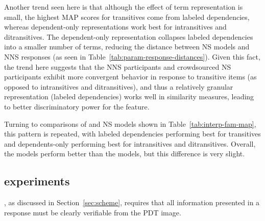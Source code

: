 Another trend seen here is that although the effect of term representation is small, the highest MAP scores for transitives come from labeled dependencies, whereas dependent-only representations work best for intransitives and ditransitives. The dependent-only representation collapses labeled dependencies into a smaller number of terms, reducing the distance between NS models and NNS responses (as seen in Table~\ref{tab:param-response-distances}). Given this fact, the trend here suggests that the NNS participants and crowdsourced NS participants exhibit more convergent behavior in response to transitive items (as opposed to intransitives and ditransitives), and thus a relatively granular representation (labeled dependencies) works well in similarity measures, leading to better discriminatory power for the  feature.

Turning to comparisons of  and  NS models shown in Table~\ref{tab:interp-fam-map}, this pattern is repeated, with labeled dependencies performing best for transitives and dependents-only performing best for intransitives and ditransitives. Overall, the  models perform better than the  models, but this difference is very slight.



\subsection{ experiments}
\label{sec:map-verif}

, as discussed in Section~\ref{sec:scheme}, requires that all information presented in a response must be clearly verifiable from the PDT image.


